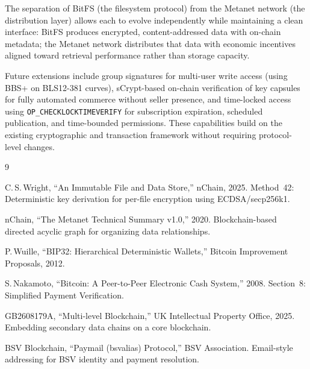 \documentclass[11pt,a4paper]{article}
\begin{document}
The separation of BitFS (the filesystem protocol) from the Metanet network (the distribution layer) allows each to evolve independently while maintaining a clean interface: BitFS produces encrypted, content-addressed data with on-chain metadata; the Metanet network distributes that data with economic incentives aligned toward retrieval performance rather than storage capacity.

Future extensions include group signatures for multi-user write access (using BBS+ on BLS12-381 curves), sCrypt-based on-chain verification of key capsules for fully automated commerce without seller presence, and time-locked access using \texttt{OP\_CHECKLOCKTIMEVERIFY} for subscription expiration, scheduled publication, and time-bounded permissions. These capabilities build on the existing cryptographic and transaction framework without requiring protocol-level changes.

\begin{thebibliography}{9}

C.\,S.\,Wright,
``An Immutable File and Data Store,''
nChain, 2025.
Method~42: Deterministic key derivation for per-file encryption using ECDSA/secp256k1.

nChain,
``The Metanet Technical Summary v1.0,''
2020.
Blockchain-based directed acyclic graph for organizing data relationships.

P.\,Wuille,
``BIP32: Hierarchical Deterministic Wallets,''
Bitcoin Improvement Proposals, 2012.

S.\,Nakamoto,
``Bitcoin: A Peer-to-Peer Electronic Cash System,''
2008.
Section~8: Simplified Payment Verification.

GB2608179A,
``Multi-level Blockchain,''
UK Intellectual Property Office, 2025.
Embedding secondary data chains on a core blockchain.

BSV Blockchain,
``Paymail (bsvalias) Protocol,''
BSV Association.
Email-style addressing for BSV identity and payment resolution.

\end{thebibliography}
\end{document}
